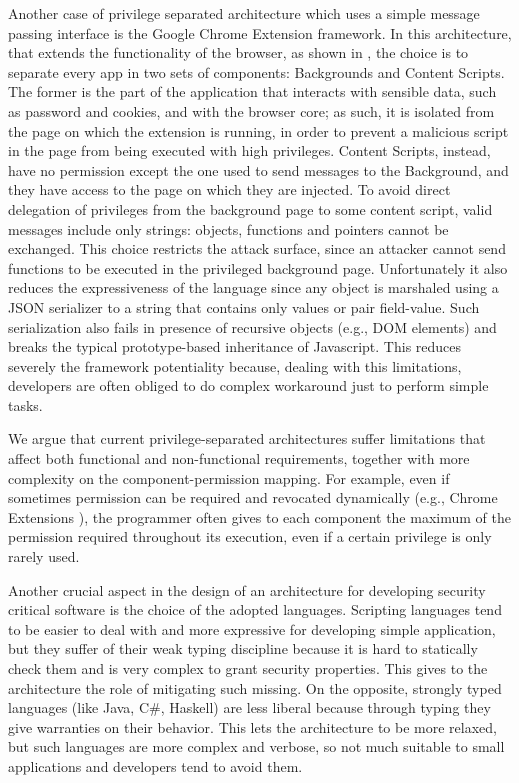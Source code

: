 \documentclass[10pt,a4paper,draft]{article}
\begin{document}
Another case of privilege separated architecture which uses a simple message passing interface is the Google Chrome Extension framework. In this architecture, that extends the functionality of the browser, as shown in \cite{ChromeExtSpec,ChromeExtSpecSnd}, the choice is to separate every app in two sets of components: Backgrounds and Content Scripts. The former is the part of the application that interacts with sensible data, such as password and cookies, and with the browser core; as such, it is isolated from the page on which the extension is running, in order to prevent a malicious script in the page from being executed with high privileges. Content Scripts, instead, have no permission except the one used to send messages to the Background, and they have access to the page on which they are injected. To avoid direct delegation of privileges from the background page to some content script, valid messages include only strings: objects, functions and pointers cannot be exchanged. This choice restricts the attack surface, since an attacker cannot send functions to be executed in the privileged background page. Unfortunately it also reduces the expressiveness of the language since any object is marshaled using a JSON serializer to a string that contains only values or pair field-value. Such serialization also fails in presence of recursive objects (e.g., DOM elements) and breaks the typical prototype-based inheritance of Javascript. This reduces severely the  framework potentiality because, dealing with this limitations, developers are often obliged to do complex workaround just to perform simple tasks.

We argue that current privilege-separated architectures suffer limitations that affect both functional and non-functional requirements, together with more complexity on the component-permission mapping. For example, even if sometimes permission can be required and revocated dynamically (e.g., Chrome Extensions \cite{ChromeExtensionOnline}), the programmer often gives to each component the maximum of the permission required throughout its execution, even if a certain privilege is only rarely used.

Another crucial aspect in the design of an architecture for developing security critical software is the choice of the adopted languages. Scripting languages tend to be easier to deal with and more expressive for developing simple application, but they suffer of their weak typing discipline because it is hard to statically check them and is very complex to grant security properties. This gives to the architecture the role of mitigating such missing. On the opposite, strongly typed languages (like Java, C\#, Haskell) are less liberal because through typing they give warranties on their behavior. This lets the architecture to be more relaxed, but such languages are more complex and verbose, so not much suitable to small applications and developers tend to avoid them.
\end{document}
